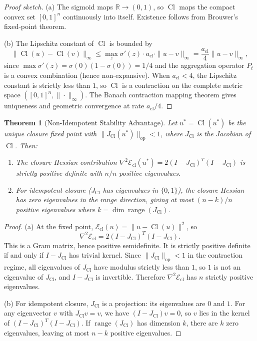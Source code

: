 \documentclass[lettersize,journal]{IEEEtran}
\newtheorem{theorem}{Theorem}
\DeclareMathOperator{\Cl}{Cl}
\begin{document}
\begin{proof}[Proof sketch]
(a) The sigmoid maps $\mathbb{R} \to (0,1)$, so $\Cl$ maps the compact convex set $[0,1]^n$ continuously into itself. Existence follows from Brouwer's fixed-point theorem.

(b) The Lipschitz constant of $\Cl$ is bounded by
\begin{equation}
\|\Cl(u) - \Cl(v)\|_\infty \leq \max_{z} \sigma'(z) \cdot a_{\mathrm{cl}} \cdot \|u - v\|_\infty = \frac{a_{\mathrm{cl}}}{4}\|u - v\|_\infty,
\end{equation}
since $\max \sigma'(z) = \sigma(0)(1-\sigma(0)) = 1/4$ and the aggregation operator $P_t$ is a convex combination (hence non-expansive). When $a_{\mathrm{cl}} < 4$, the Lipschitz constant is strictly less than $1$, so $\Cl$ is a contraction on the complete metric space $([0,1]^n, \|\cdot\|_\infty)$. The Banach contraction mapping theorem gives uniqueness and geometric convergence at rate $a_{\mathrm{cl}}/4$.
\end{proof}

\begin{theorem}[Non-Idempotent Stability Advantage]
\label{thm:nonidempotent}
Let $u^* = \Cl(u^*)$ be the unique closure fixed point with $\|J_{\Cl}(u^*)\|_{\mathrm{op}} < 1$, where $J_{\Cl}$ is the Jacobian of $\Cl$. Then:
\begin{enumerate}
\item[(a)] The closure Hessian contribution $\nabla^2 \mathcal{E}_{\mathrm{cl}}(u^*) = 2(I - J_{\Cl})^T(I - J_{\Cl})$ is strictly positive definite with $n/n$ positive eigenvalues.
\item[(b)] For idempotent closure ($J_{\Cl}$ has eigenvalues in $\{0,1\}$), the closure Hessian has zero eigenvalues in the range direction, giving at most $(n-k)/n$ positive eigenvalues where $k = \dim \operatorname{range}(J_{\Cl})$.
\end{enumerate}
\end{theorem}

\begin{proof}
(a) At the fixed point, $\mathcal{E}_{\mathrm{cl}}(u) = \|u - \Cl(u)\|^2$, so
\[
\nabla^2 \mathcal{E}_{\mathrm{cl}} = 2(I - J_{\Cl})^T(I - J_{\Cl}).
\]
This is a Gram matrix, hence positive semidefinite. It is strictly positive definite if and only if $I - J_{\Cl}$ has trivial kernel. Since $\|J_{\Cl}\|_{\mathrm{op}} < 1$ in the contraction regime, all eigenvalues of $J_{\Cl}$ have modulus strictly less than $1$, so $1$ is not an eigenvalue of $J_{\Cl}$, and $I - J_{\Cl}$ is invertible. Therefore $\nabla^2\mathcal{E}_{\mathrm{cl}}$ has $n$ strictly positive eigenvalues.

(b) For idempotent closure, $J_{\Cl}$ is a projection: its eigenvalues are $0$ and $1$. For any eigenvector $v$ with $J_{\Cl} v = v$, we have $(I - J_{\Cl})v = 0$, so $v$ lies in the kernel of $(I-J_{\Cl})^T(I-J_{\Cl})$. If $\operatorname{range}(J_{\Cl})$ has dimension $k$, there are $k$ zero eigenvalues, leaving at most $n - k$ positive eigenvalues.
\end{proof}
\end{document}
